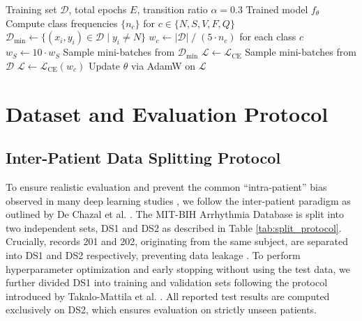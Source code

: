 \documentclass[pdflatex,sn-mathphys-num]{sn-jnl}
\theoremstyle{thmstyleone}
\theoremstyle{thmstyletwo}
\theoremstyle{thmstylethree}
\begin{document}
\begin{algorithm}[!t]
\caption{Minority-First Curriculum Learning Schedule}
\label{alg:curriculum}
\begin{algorithmic}[1]
\Require Training set $\mathcal{D}$, total epochs $E$, transition ratio $\alpha = 0.3$
\Ensure Trained model $f_\theta$
\State Compute class frequencies $\{n_c\}$ for $c \in \{N, S, V, F, Q\}$
\State $\mathcal{D}_{\text{min}} \gets \{(x_i, y_i) \in \mathcal{D} \mid y_i \neq N\}$ 
\State $w_c \gets |\mathcal{D}| \;/\; (5 \cdot n_c)$ for each class $c$ 
\State $w_S \gets 10 \cdot w_S$ 
     
        \State Sample mini-batches from $\mathcal{D}_{\text{min}}$ 
        \State $\mathcal{L} \gets \mathcal{L}_{\text{CE}}$ 
    \Else {}
        \State Sample mini-batches from $\mathcal{D}$ 
        \State $\mathcal{L} \gets \mathcal{L}_{\text{CE}}(w_c)$ 
    \EndIf
    \State Update $\theta$ via AdamW on $\mathcal{L}$
\EndFor
\end{algorithmic}
\end{algorithm}

\section{Dataset and Evaluation Protocol}

\subsection{Inter-Patient Data Splitting Protocol}
To ensure realistic evaluation and prevent the common ``intra-patient'' bias observed in many deep learning studies \cite{bahrami_investigation_2025, xiao_deep_2023}, we follow the inter-patient paradigm as outlined by De Chazal et al. \cite{chazal_automatic_2004}. The MIT-BIH Arrhythmia Database is split into two independent sets, DS1 and DS2 as described in Table \ref{tab:split_protocol}. Crucially, records 201 and 202, originating from the same subject, are separated into DS1 and DS2 respectively, preventing data leakage \cite{xiao_deep_2023}. To perform hyperparameter optimization and early stopping without using the test data, we further divided DS1 into training and validation sets following the protocol introduced by Takalo-Mattila et al. \cite{takalo-mattila_inter-patient_2018}. All reported test results are computed exclusively on DS2, which ensures evaluation on strictly unseen patients.
\end{document}
